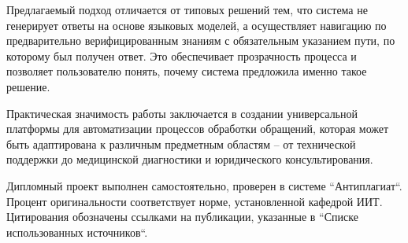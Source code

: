 Предлагаемый подход отличается от типовых решений тем, что система не генерирует ответы на основе языковых моделей, а осуществляет навигацию по предварительно верифицированным знаниям с обязательным указанием пути, по которому был получен ответ. Это обеспечивает прозрачность процесса и позволяет пользователю понять, почему система предложила именно такое решение.

Практическая значимость работы заключается в создании универсальной платформы для автоматизации процессов обработки обращений, которая может быть адаптирована к различным предметным областям – от технической поддержки до медицинской диагностики и юридического консультирования.

Дипломный проект выполнен самостоятельно, проверен в системе ``Антиплагиат``. Процент оригинальности соответствует норме, установленной кафедрой ИИТ. Цитирования обозначены ссылками на публикации, указанные в ``Списке использованных источников``.